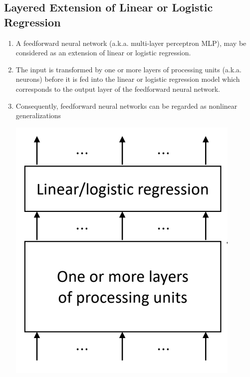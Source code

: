 \documentclass[11pt]{article}
\begin{document}
\subsection{Layered Extension of Linear or Logistic Regression}
\begin{enumerate}
\item A feedforward neural network (a.k.a. multi-layer perceptron MLP), may be considered as an extension of linear or logistic regression.
\item The input is transformed by one or more layers of processing units (a.k.a. neurons) before it is fed into the linear or logistic regression model which corresponds to the output layer of the feedforward neural network.
\item Consequently, feedforward neural networks can be regarded as nonlinear generalizations
\begin{center}
\includegraphics[scale=0.5]{img/FNN1.png}
\end{center}
\end{enumerate}
\end{document}
